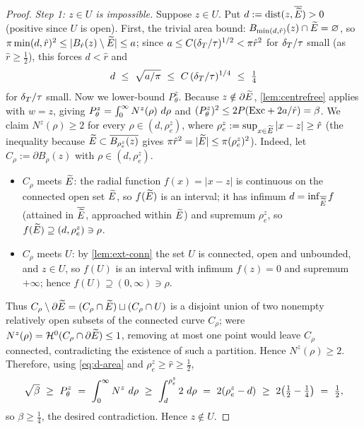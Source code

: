\begin{proof}
\emph{Step 1: $z\in U$ is impossible.} Suppose $z\in U$. Put
$d:=\operatorname{dist}(z,\overline{\widetilde{E}})>0$ (positive since $U$ is open). First, the
trivial area bound: $B_{\min(d,\hat r)}(z)\cap\widetilde{E}=\varnothing$, so
$\pi\min(d,\hat r)^2\le|B_{\hat r}(z)\setminus\widetilde{E}|\le a$; since $a\le
C(\delta_T/\tau)^{1/2}<\pi\hat r^2$ for $\delta_T/\tau$ small (as $\hat r\ge\tfrac12$),
this forces $d<\hat r$ and
\begin{equation}\label{eq:d-area}
   d\ \le\ \sqrt{a/\pi}\ \le\ C\,(\dT/\tau)^{1/4}\ \le\ \tfrac14
\end{equation}
for $\delta_T/\tau$ small. Now we lower-bound $P_\theta^z$. Because $z\notin
\partial\widetilde{E}$, \cref{lem:centrefree} applies with $w=z$, giving
$P_\theta^z=\int_0^\infty N^z(\rho)\,\,d\rho$ and
$(P_\theta^z)^2\le2P(\mathrm{Exc}+2a/\hat r)=\beta$. We claim $N^z(\rho)\ge2$ for
every $\rho\in(d,\rho_e^z)$, where $\rho_e^z:=\sup_{x\in\widetilde{E}}|x-z|\ge\hat r$
(the inequality because $\widetilde{E}\subset\overline{B_{\rho_e^z}(z)}$ gives
$\pi\hat r^2=|\widetilde{E}|\le\pi(\rho_e^z)^2$). Indeed, let $C_\rho:=\partial
B_\rho(z)$ with $\rho\in(d,\rho_e^z)$.
\begin{itemize}[leftmargin=1.6em]
\item $C_\rho$ meets $\widetilde{E}$: the radial function $f(x)=|x-z|$ is continuous
on the connected open set $\widetilde{E}$, so $f(\widetilde{E})$ is an interval; it has
infimum $d=\inf_{\overline{\widetilde{E}}}f$ (attained in $\overline{\widetilde{E}}$, approached
within $\widetilde{E}$) and supremum $\rho_e^z$, so $f(\widetilde{E})\supseteq(d,\rho_e^z)\ni
\rho$.
\item $C_\rho$ meets $U$: by \cref{lem:ext-conn} the set $U$ is connected,
open and unbounded, and $z\in U$, so $f(U)$ is an interval with infimum
$f(z)=0$ and supremum $+\infty$; hence $f(U)\supseteq(0,\infty)\ni\rho$.
\end{itemize}
Thus $C_\rho\setminus\partial\widetilde{E}=(C_\rho\cap\widetilde{E})\sqcup(C_\rho\cap U)$ is a
disjoint union of two nonempty relatively open subsets of the connected curve
$C_\rho$; were $N^z(\rho)=\mathcal{H}^0(C_\rho\cap\partial\widetilde{E})\le1$, removing at most
one point would leave $C_\rho$ connected, contradicting the existence of such a
partition. Hence $N^z(\rho)\ge2$. Therefore, using \eqref{eq:d-area} and
$\rho_e^z\ge\hat r\ge\tfrac12$,
\[
   \sqrt{\beta}\ \ge\ P_\theta^z\ =\ \int_0^\infty N^z\,\d\rho\ \ge\
   \int_{d}^{\rho_e^z}2\,\d\rho\ =\ 2(\rho_e^z-d)\ \ge\ 2\bigl(\tfrac12-
   \tfrac14\bigr)\ =\ \tfrac12,
\]
so $\beta\ge\tfrac14$, the desired contradiction. Hence $z\notin U$.


\end{proof}
